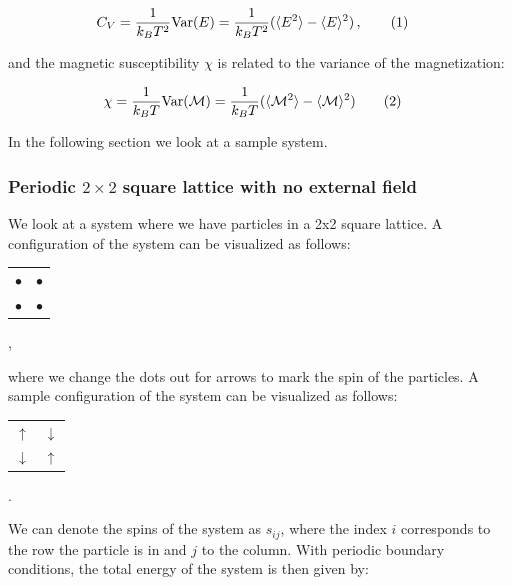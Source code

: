 \documentclass[reprint,english,notitlepage]{revtex4-1}  %
\newcommand\numberthis{\addtocounter{equation}{1}\tag{\theequation}}
\begin{document}
\begin{align*}
C_V &= \frac{1}{k_B T^2} \text{Var}(E) = \frac{1}{k_B T^2} (\langle E^2 \rangle - \langle E \rangle^2) \, ,\numberthis \label{eq:heat_capacity}
\end{align*}

and the magnetic susceptibility $\chi$ is related to the variance of the magnetization:

\begin{align*}
\chi &= \frac{1}{k_B T} \text{Var}(\mathcal{M}) = \frac{1}{k_B T} ( \langle \mathcal{M}^2 \rangle - \langle \mathcal{M} \rangle^2) \numberthis \label{eq:magnetic_susceptibility}
\end{align*}

In the following section we look at a sample system.


\subsubsection{Periodic \( 2 \times 2 \) square lattice with no external field} \label{sec:II:A:i}

We look at a system where we have particles in a 2x2 square lattice. A configuration of the system can be visualized as follows: \newline

\begin{center}
\begin{tabular}{cc}
$\bullet$ & $\bullet$ \\
$\bullet$ & $\bullet$
\end{tabular}  , \newline
\end{center}

where we change the dots out for arrows to mark the spin of the particles. A sample configuration of the system can be visualized as follows: \newline

\begin{center}
\begin{tabular}{cc}
$\uparrow$ & $\downarrow$ \\
$\downarrow$ & $\uparrow$
\end{tabular}  . \newline
\end{center}


We can denote the spins of the system as $s_{ij}$, where the index $i$ corresponds to the row the particle is in and $j$ to the column. With periodic boundary conditions, the total energy of the system is then given by:
\end{document}
